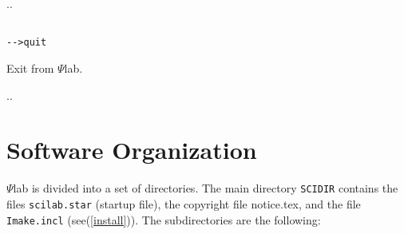 \noindent.\dotfill.
\begin{verbatim}

-->quit

\end{verbatim}
Exit from $\Psi$lab.

\noindent.\dotfill.




\section{Software Organization}

$\Psi$lab is divided into a set of directories. The main directory
\verb!SCIDIR! contains the files {\tt scilab.star} (startup file), the
copyright file notice.tex, and the file \verb!Imake.incl! (see(\ref{install})).
The subdirectories are the following:
